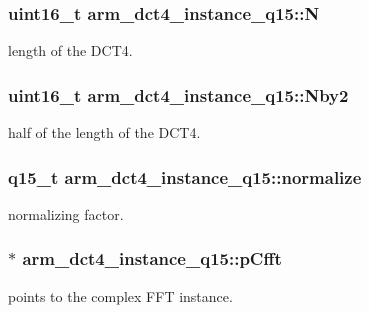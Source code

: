 \subsubsection[{\texorpdfstring{N}{N}}]{\setlength{\rightskip}{0pt plus 5cm}uint16\+\_\+t arm\+\_\+dct4\+\_\+instance\+\_\+q15\+::N}\hypertarget{structarm__dct4__instance__q15_a53d24009bb9b2e93d0aa07db7f1a6c25}{}\label{structarm__dct4__instance__q15_a53d24009bb9b2e93d0aa07db7f1a6c25}
length of the D\+C\+T4. 
\subsubsection[{\texorpdfstring{Nby2}{Nby2}}]{\setlength{\rightskip}{0pt plus 5cm}uint16\+\_\+t arm\+\_\+dct4\+\_\+instance\+\_\+q15\+::\+Nby2}\hypertarget{structarm__dct4__instance__q15_af43dcbbc2fc661ffbc525afe3dcbd7da}{}\label{structarm__dct4__instance__q15_af43dcbbc2fc661ffbc525afe3dcbd7da}
half of the length of the D\+C\+T4. 
\subsubsection[{\texorpdfstring{normalize}{normalize}}]{\setlength{\rightskip}{0pt plus 5cm}q15\+\_\+t arm\+\_\+dct4\+\_\+instance\+\_\+q15\+::normalize}\hypertarget{structarm__dct4__instance__q15_a197098140d68e89a08f7a249003a0b86}{}\label{structarm__dct4__instance__q15_a197098140d68e89a08f7a249003a0b86}
normalizing factor. 
\subsubsection[{\texorpdfstring{p\+Cfft}{pCfft}}]{$\ast$ arm\+\_\+dct4\+\_\+instance\+\_\+q15\+::p\+Cfft}\hypertarget{structarm__dct4__instance__q15_a7284932ee8c36107c33815eb62eadffc}{}\label{structarm__dct4__instance__q15_a7284932ee8c36107c33815eb62eadffc}
points to the complex F\+FT instance. 

